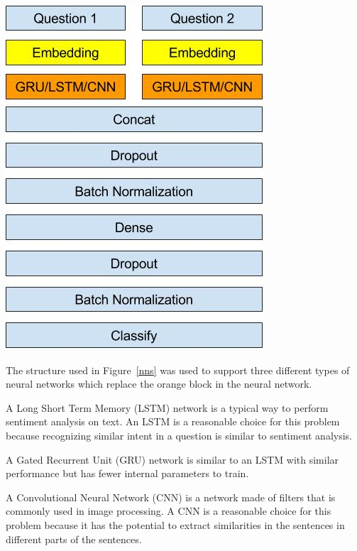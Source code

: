 \documentclass{article}
\begin{document}
\begin{center}
  \includegraphics[width=\textwidth]{NeuralNetStructure}
  \label{nns}
\end{center}

The structure used in Figure~\ref{nns} was used to support three different types of neural networks which replace the orange block in the neural network.

A Long Short Term Memory (LSTM) network is a typical way to perform sentiment analysis on text. An LSTM is a reasonable choice for this problem because recognizing similar intent in a question is similar to sentiment analysis.

A Gated Recurrent Unit (GRU) network is similar to an LSTM with similar performance but has fewer internal parameters to train.

A Convolutional Neural Network (CNN) is a network made of filters that is commonly used in image processing. A CNN is a reasonable choice for this problem because it has the potential to extract similarities in the sentences in different parts of the sentences.
\end{document}
